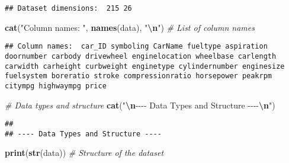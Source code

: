 \documentclass[
]{article}
\newenvironment{Shaded}{\begin{snugshade}}{\end{snugshade}}
\newcommand{\CommentTok}[1]{\textcolor[rgb]{0.56,0.35,0.01}{\textit{#1}}}
\newcommand{\FunctionTok}[1]{\textcolor[rgb]{0.13,0.29,0.53}{\textbf{#1}}}
\newcommand{\NormalTok}[1]{#1}
\newcommand{\SpecialCharTok}[1]{\textcolor[rgb]{0.81,0.36,0.00}{\textbf{#1}}}
\newcommand{\StringTok}[1]{\textcolor[rgb]{0.31,0.60,0.02}{#1}}
\begin{document}
\begin{verbatim}
## Dataset dimensions:  215 26
\end{verbatim}

\begin{Shaded}
\begin{Highlighting}[]
\FunctionTok{cat}\NormalTok{(}\StringTok{"Column names: "}\NormalTok{, }\FunctionTok{names}\NormalTok{(data), }\StringTok{"}\SpecialCharTok{\textbackslash{}n}\StringTok{"}\NormalTok{)  }\CommentTok{\# List of column names}
\end{Highlighting}
\end{Shaded}

\begin{verbatim}
## Column names:  car_ID symboling CarName fueltype aspiration doornumber carbody drivewheel enginelocation wheelbase carlength carwidth carheight curbweight enginetype cylindernumber enginesize fuelsystem boreratio stroke compressionratio horsepower peakrpm citympg highwaympg price
\end{verbatim}

\begin{Shaded}
\begin{Highlighting}[]
\CommentTok{\# Data types and structure}
\FunctionTok{cat}\NormalTok{(}\StringTok{"}\SpecialCharTok{\textbackslash{}n}\StringTok{{-}{-}{-}{-} Data Types and Structure {-}{-}{-}{-}}\SpecialCharTok{\textbackslash{}n}\StringTok{"}\NormalTok{)}
\end{Highlighting}
\end{Shaded}

\begin{verbatim}
## 
## ---- Data Types and Structure ----
\end{verbatim}

\begin{Shaded}
\begin{Highlighting}[]
\FunctionTok{print}\NormalTok{(}\FunctionTok{str}\NormalTok{(data))  }\CommentTok{\# Structure of the dataset}
\end{Highlighting}
\end{Shaded}
\end{document}
